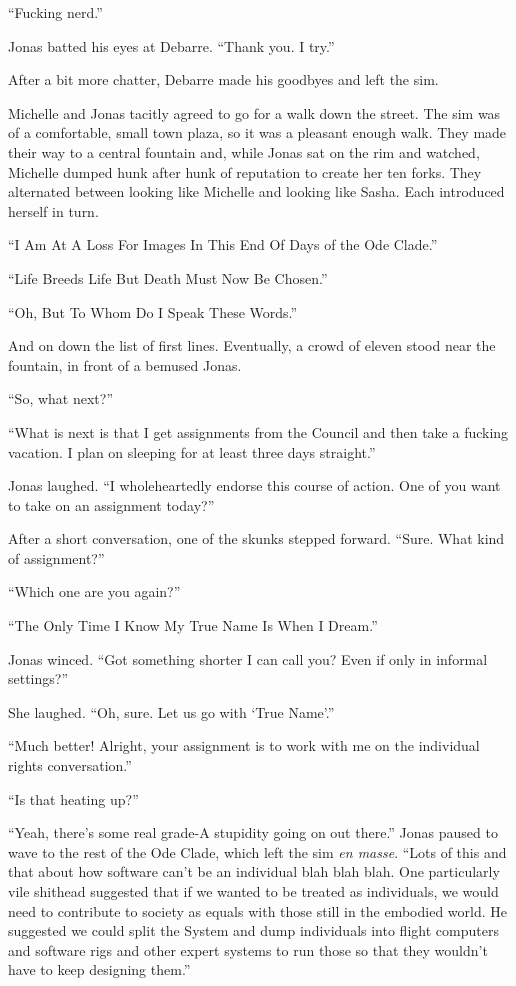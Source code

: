 ``Fucking nerd.''

Jonas batted his eyes at Debarre. ``Thank you. I try.''

After a bit more chatter, Debarre made his goodbyes and left the sim.

Michelle and Jonas tacitly agreed to go for a walk down the street. The sim was of a comfortable, small town plaza, so it was a pleasant enough walk. They made their way to a central fountain and, while Jonas sat on the rim and watched, Michelle dumped hunk after hunk of reputation to create her ten forks. They alternated between looking like Michelle and looking like Sasha. Each introduced herself in turn.

``I Am At A Loss For Images In This End Of Days of the Ode Clade.''

``Life Breeds Life But Death Must Now Be Chosen.''

``Oh, But To Whom Do I Speak These Words.''

And on down the list of first lines. Eventually, a crowd of eleven stood near the fountain, in front of a bemused Jonas.

``So, what next?''

``What is next is that I get assignments from the Council and then take a fucking vacation. I plan on sleeping for at least three days straight.''

Jonas laughed. ``I wholeheartedly endorse this course of action. One of you want to take on an assignment today?''

After a short conversation, one of the skunks stepped forward. ``Sure. What kind of assignment?''

``Which one are you again?''

``The Only Time I Know My True Name Is When I Dream.''

Jonas winced. ``Got something shorter I can call you? Even if only in informal settings?''

She laughed. ``Oh, sure. Let us go with `True Name'.''

``Much better! Alright, your assignment is to work with me on the individual rights conversation.''

``Is that heating up?''

``Yeah, there's some real grade-A stupidity going on out there.'' Jonas paused to wave to the rest of the Ode Clade, which left the sim \emph{en masse}. ``Lots of this and that about how software can't be an individual blah blah blah. One particularly vile shithead suggested that if we wanted to be treated as individuals, we would need to contribute to society as equals with those still in the embodied world. He suggested we could split the System and dump individuals into flight computers and software rigs and other expert systems to run those so that they wouldn't have to keep designing them.''


